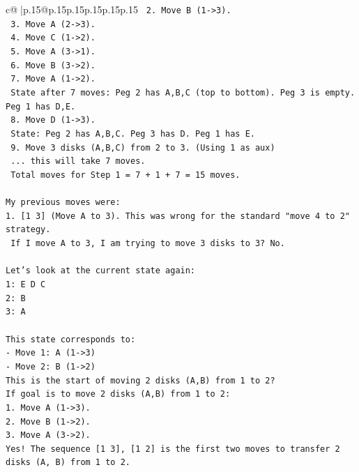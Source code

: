 \documentclass{article}
\begin{document}
{\begin{supertabular}{c@{$\;$}|p{.15\linewidth}@{}p{.15\linewidth}p{.15\linewidth}p{.15\linewidth}p{.15\linewidth}p{.15\linewidth}}
{{{\texttt{    2. Move B (1{-}>3).} \\
\texttt{    3. Move A (2{-}>3).} \\
\texttt{    4. Move C (1{-}>2).} \\
\texttt{    5. Move A (3{-}>1).} \\
\texttt{    6. Move B (3{-}>2).} \\
\texttt{    7. Move A (1{-}>2).} \\
\texttt{    State after 7 moves: Peg 2 has A,B,C (top to bottom). Peg 3 is empty. Peg 1 has D,E.} \\
\texttt{    8. Move D (1{-}>3).} \\
\texttt{    State: Peg 2 has A,B,C. Peg 3 has D. Peg 1 has E.} \\
\texttt{    9. Move 3 disks (A,B,C) from 2 to 3. (Using 1 as aux)} \\
\texttt{       ... this will take 7 moves.} \\
\texttt{       Total moves for Step 1 = 7 + 1 + 7 = 15 moves.} \\
\\ 
\texttt{My previous moves were:} \\
\texttt{1. {[}1 3{]} (Move A to 3). This was wrong for the standard "move 4 to 2" strategy.} \\
\texttt{   If I move A to 3, I am trying to move 3 disks to 3? No.} \\
\\ 
\texttt{Let's look at the current state again:} \\
\texttt{1: E D C} \\
\texttt{2: B} \\
\texttt{3: A} \\
\\ 
\texttt{This state corresponds to:} \\
\texttt{{-} Move 1: A (1{-}>3)} \\
\texttt{{-} Move 2: B (1{-}>2)} \\
\texttt{This is the start of moving 2 disks (A,B) from 1 to 2?} \\
\texttt{If goal is to move 2 disks (A,B) from 1 to 2:} \\
\texttt{1. Move A (1{-}>3).} \\
\texttt{2. Move B (1{-}>2).} \\
\texttt{3. Move A (3{-}>2).} \\
\texttt{Yes! The sequence {[}1 3{]}, {[}1 2{]} is the first two moves to transfer 2 disks (A, B) from 1 to 2.} \\
}}}
\end{supertabular}}
\end{document}

